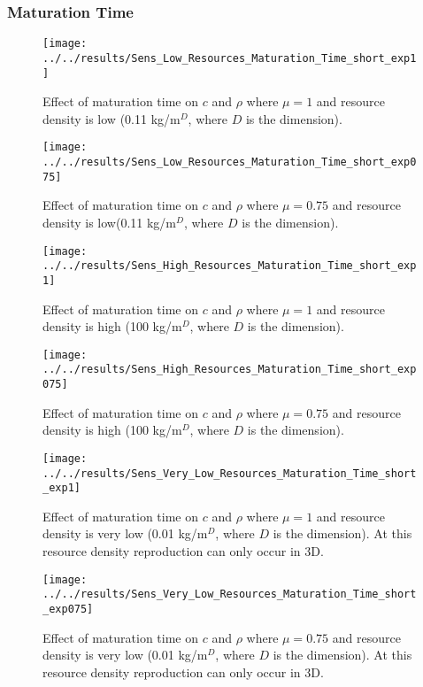 \subsubsection{Maturation Time}
\begin{figure}[h]
	\centering
	\texttt{[image: ../../results/Sens\_Low\_Resources\_Maturation\_Time\_short\_exp1]}
	\caption{Effect of maturation time on $c$ and $\rho$ where $\mu = 1$ and resource density is low (0.11 kg/m$^D$, where $D$ is the dimension).}
	\label{fig:senslowresourcesmaturationtimeshortexp1}
\end{figure}
\begin{figure}
	\centering
	\texttt{[image: ../../results/Sens\_Low\_Resources\_Maturation\_Time\_short\_exp075]}
	\caption{Effect of maturation time on $c$ and $\rho$ where $\mu = 0.75$ and resource density is low(0.11 kg/m$^D$, where $D$ is the dimension).}
	\label{fig:senslowresourcesmaturationtimeshortexp075}
\end{figure}
\begin{figure}
	\centering
	\texttt{[image: ../../results/Sens\_High\_Resources\_Maturation\_Time\_short\_exp1]}
	\caption{Effect of maturation time on $c$ and $\rho$ where $\mu = 1$ and resource density is high (100 kg/m$^D$, where $D$ is the dimension).}
	\label{fig:senshighresourcesmaturationtimeshortexp1}
\end{figure}
\begin{figure}
	\centering
	\texttt{[image: ../../results/Sens\_High\_Resources\_Maturation\_Time\_short\_exp075]}
	\caption{Effect of maturation time on $c$ and $\rho$ where $\mu = 0.75$ and resource density is high (100 kg/m$^D$, where $D$ is the dimension).}
	\label{fig:sensmaturationtimeshortexp075}
\end{figure}
\begin{figure}
	\centering
	\texttt{[image: ../../results/Sens\_Very\_Low\_Resources\_Maturation\_Time\_short\_exp1]}
	\caption{Effect of maturation time on $c$ and $\rho$ where $\mu = 1$ and resource density is very low (0.01 kg/m$^D$, where $D$ is the dimension).  At this resource density reproduction can only occur in 3D.}
	\label{fig:sensverylowresourcesmaturationtimeshortexp1}
\end{figure}
\begin{figure}
	\centering
	\texttt{[image: ../../results/Sens\_Very\_Low\_Resources\_Maturation\_Time\_short\_exp075]}
	\caption{Effect of maturation time on $c$ and $\rho$ where $\mu = 0.75$ and resource density is very low (0.01 kg/m$^D$, where $D$ is the dimension).  At this resource density reproduction can only occur in 3D.}
	\label{fig:sensverylowresourcesmaturationtimeshortexp075}
\end{figure}

